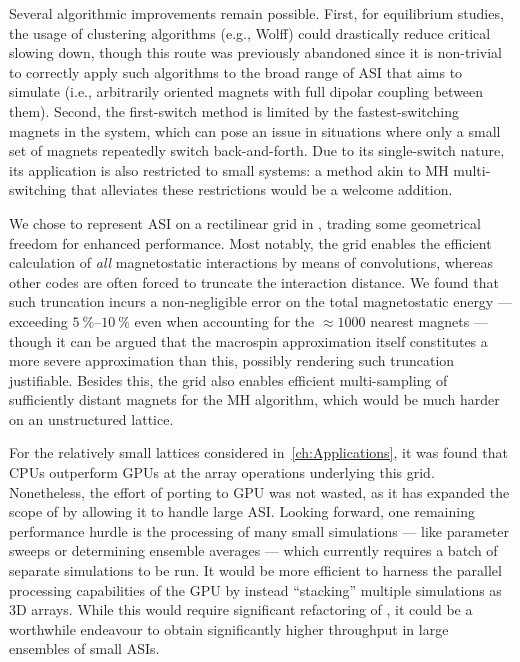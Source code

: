 Several algorithmic improvements remain possible.
First, for equilibrium studies, the usage of clustering algorithms (e.g., Wolff) could drastically reduce critical slowing down, though this route was previously abandoned since it is non-trivial to correctly apply such algorithms to the broad range of ASI that \hotspice aims to simulate (i.e., arbitrarily oriented magnets with full dipolar coupling between them).
Second, the first-switch method is limited by the fastest-switching magnets in the system, which can pose an issue in situations where only a small set of magnets repeatedly switch back-and-forth.
Due to its single-switch nature, its application is also restricted to small systems: a method akin to MH multi-switching that alleviates these restrictions would be a welcome addition. \par
We chose to represent ASI on a rectilinear grid in \hotspice, trading some geometrical freedom for enhanced performance. %
Most notably, the grid enables the efficient calculation of \textit{all} magnetostatic interactions by means of convolutions, whereas other codes are often forced to truncate the interaction distance.
We found that such truncation incurs a non-negligible error on the total magnetostatic energy --- exceeding $\SIrange{5}{10}{\percent}$ even when accounting for the $\approx 1000$ nearest magnets --- though it can be argued that the macrospin approximation itself constitutes a more severe approximation than this, possibly rendering such truncation justifiable.
Besides this, the grid also enables efficient multi-sampling of sufficiently distant magnets for the MH algorithm, which would be much harder on an unstructured lattice. \par
For the relatively small lattices considered in~\cref{ch:Applications}, it was found that CPUs outperform GPUs at the array operations underlying this grid. %
Nonetheless, the effort of porting \hotspice to GPU was not wasted, as it has expanded the scope of \hotspice by allowing it to handle large ASI.
Looking forward, one remaining performance hurdle is the processing of many small simulations --- like parameter sweeps or determining ensemble averages --- which currently requires a batch of separate simulations to be run.
It would be more efficient to harness the parallel processing capabilities of the GPU by instead ``stacking'' multiple simulations as 3D arrays.
While this would require significant refactoring of \hotspice, it could be a worthwhile endeavour to obtain significantly higher throughput in large ensembles of small ASIs.

